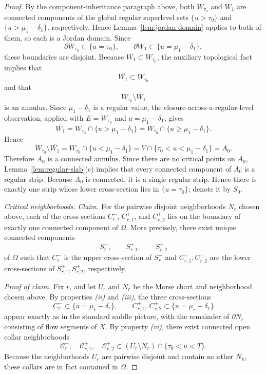 \documentclass[12pt]{amsart}
\theoremstyle{definition}
\theoremstyle{remark}
\begin{document}
\begin{proof}
By the component-inheritance paragraph above, both $W_{\tau_0}$ and $W_1$ are connected
components of the global regular superlevel sets $\{u>\tau_0\}$ and $\{u>\mu_1-\delta_1\}$,
respectively. Hence Lemma~\ref{lem:jordan-domain} applies to both of them, so each is a Jordan domain. Since
\[
\partial W_{\tau_0}\subset \{u=\tau_0\},
\qquad
\partial W_1\subset \{u=\mu_1-\delta_1\},
\]
these boundaries are disjoint. Because $W_1\subset W_{\tau_0}$, the auxiliary topological fact implies that
\[
\overline{W_1}\subset W_{\tau_0}
\]
and that
\[
W_{\tau_0}\setminus \overline{W_1}
\]
is an annulus. Since $\mu_1-\delta_1$ is a regular value, the closure-across-a-regular-level observation, applied with $E=W_{\tau_0}$ and $a=\mu_1-\delta_1$, gives
\[
\overline{W_1}
=
\overline{W_{\tau_0}\cap\{u>\mu_1-\delta_1\}}
=
W_{\tau_0}\cap\{u\ge \mu_1-\delta_1\}.
\]
Hence
\[
W_{\tau_0}\setminus \overline{W_1}
=
W_{\tau_0}\cap\{u<\mu_1-\delta_1\}
=
V\cap\{\tau_0<u<\mu_1-\delta_1\}
=
A_0.
\]
Therefore $A_0$ is a connected annulus. Since there are no critical points on $A_0$, Lemma~\ref{lem:regular-slab}(c) implies that every connected component of $A_0$ is a regular strip. Because $A_0$ is connected, it is a single regular strip. Hence there is exactly one strip whose lower cross-section lies in $\{u=\tau_0\}$; denote it by $S_0$.

\smallskip
\noindent\emph{Critical neighborhoods.}
\medskip
\noindent\emph{Claim.}
For the pairwise disjoint neighborhoods $N_r$ chosen above, each of the cross-sections
$C_r^{-}$, $C_{r,1}^{+}$, and $C_{r,2}^{+}$ lies on the boundary of exactly one connected component of
$\Omega$. More precisely, there exist unique connected components
\[
S_r^{-},\qquad S_{r,1}^{+},\qquad S_{r,2}^{+}
\]
of $\Omega$ such that $C_r^{-}$ is the upper cross-section of $S_r^{-}$ and
$C_{r,1}^{+}, C_{r,2}^{+}$ are the lower cross-sections of $S_{r,1}^{+}, S_{r,2}^{+}$, respectively.

\smallskip
\noindent\emph{Proof of claim.}
Fix $r$, and let $U_r$ and $N_r$ be the Morse chart and neighborhood chosen above. By properties \emph{(ii)} and \emph{(iii)}, the three cross-sections
\[
C_r^- \subset \{u=\mu_r-\delta_r\},
\qquad
C_{r,1}^+,\, C_{r,2}^+ \subset \{u=\mu_r+\delta_r\}
\]
appear exactly as in the standard saddle picture, with the remainder of $\partial N_r$
consisting of flow segments of $X$. By property \emph{(vi)}, there exist connected
open collar neighborhoods
\[
\mathcal C_r^-,
\quad
\mathcal C_{r,1}^+,
\quad
\mathcal C_{r,2}^+
\subset (U_r \setminus N_r)\cap \{\tau_0<u<T\}.
\]
Because the neighborhoods $U_r$ are pairwise disjoint and contain no other $N_k$, these collars are in fact contained in $\Omega$.


\end{proof}
\end{document}
